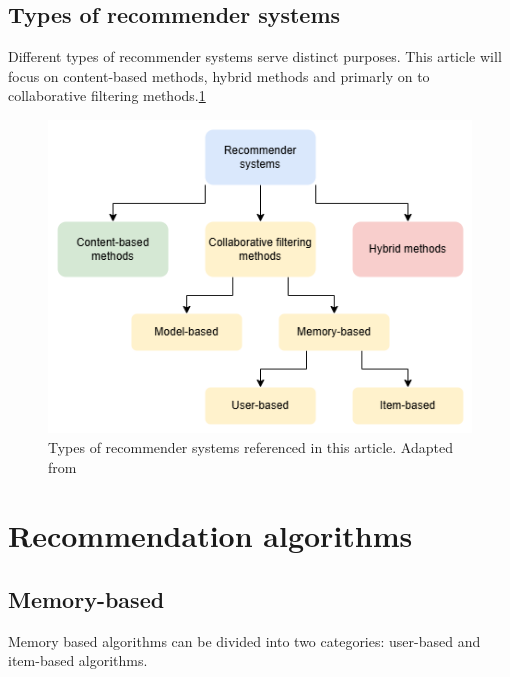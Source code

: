 \documentclass[10pt,twoside,english,a4paper]{article}
\begin{document}
\subsection{Types of recommender systems}

Different types of recommender systems serve distinct purposes. This article will focus on content-based methods, hybrid methods and primarly on to collaborative filtering methods.\ref{fig:fig2}

\begin{figure}[H]
	\includegraphics[width=1\textwidth]{./diagrams/recommender_systems_types.png}
	\caption{Types of recommender systems referenced in this article. Adapted from \cite{10113923}}
	\label{fig:fig2}
\end{figure}






\section{Recommendation algorithms}

\subsection{Memory-based}
Memory based algorithms can be divided into two categories:
user-based\cite{WANG2017102} and item-based algorithms.
\medskip
\end{document}

